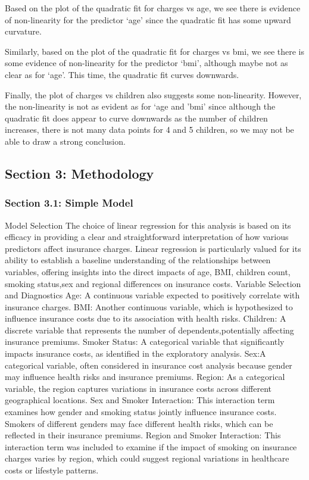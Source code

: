 \documentclass[
  12pt,
]{article}
\begin{document}
Based on the plot of the quadratic fit for charges vs age, we see there
is evidence of non-linearity for the predictor `age' since the quadratic
fit has some upward curvature.

Similarly, based on the plot of the quadratic fit for charges vs bmi, we
see there is some evidence of non-linearity for the predictor `bmi',
although maybe not as clear as for `age'. This time, the quadratic fit
curves downwards.

Finally, the plot of charges vs children also suggests some
non-linearity. However, the non-linearity is not as evident as for `age
and 'bmi' since although the quadratic fit does appear to curve
downwards as the number of children increases, there is not many data
points for 4 and 5 children, so we may not be able to draw a strong
conclusion.

\newpage

\subsection{Section 3: Methodology}\label{section-3-methodology}

\subsubsection{Section 3.1: Simple
Model}\label{section-3.1-simple-model}

Model Selection The choice of linear regression for this analysis is
based on its efficacy in providing a clear and straightforward
interpretation of how various predictors affect insurance charges.
Linear regression is particularly valued for its ability to establish a
baseline understanding of the relationships between variables, offering
insights into the direct impacts of age, BMI, children count, smoking
status,sex and regional differences on insurance costs. Variable
Selection and Diagnostics Age: A continuous variable expected to
positively correlate with insurance charges. BMI: Another continuous
variable, which is hypothesized to influence insurance costs due to its
association with health risks. Children: A discrete variable that
represents the number of dependents,potentially affecting insurance
premiums. Smoker Status: A categorical variable that significantly
impacts insurance costs, as identified in the exploratory analysis.
Sex:A categorical variable, often considered in insurance cost analysis
because gender may influence health risks and insurance premiums.
Region: As a categorical variable, the region captures variations in
insurance costs across different geographical locations. Sex and Smoker
Interaction: This interaction term examines how gender and smoking
status jointly influence insurance costs. Smokers of different genders
may face different health risks, which can be reflected in their
insurance premiums. Region and Smoker Interaction: This interaction term
was included to examine if the impact of smoking on insurance charges
varies by region, which could suggest regional variations in healthcare
costs or lifestyle patterns.
\end{document}
